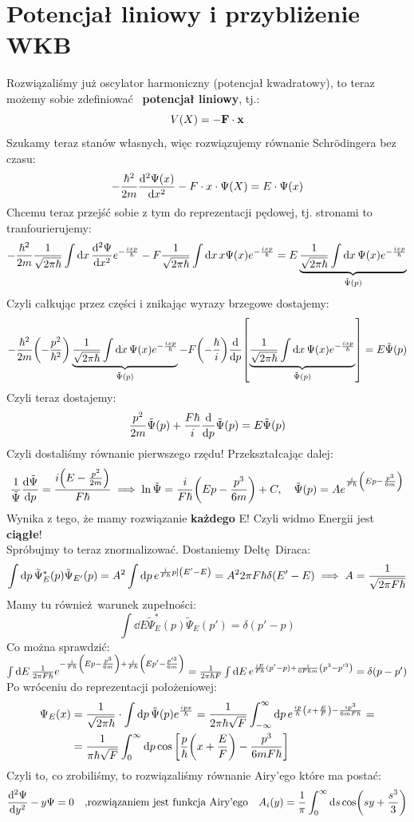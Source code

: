 \documentclass[12pt,a4paper]{report}
\newcommand{\subind}[2]{{\color{blue} #1\index{#2}}}
\newcommand{\tpsi}{\tilde{\Psi}}
\renewcommand{\emph}{\textbf}
\newcommand{\fft}[1]{\frac{1}{\sqrt{2\pi\hbar}} \int \dd{x} #1 e^{-\frac{ixp}{\hbar}}}
\newenvironment{lecture}[1]{\par\medskip
   \noindent\chapter{#1} \rmfamily}{\medskip}
\begin{document}

\begin{lecture}{Potencjał liniowy i przybliżenie WKB}
Rozwiązaliśmy już oscylator harmoniczny (potencjał kwadratowy), to teraz możemy sobie zdefiniować \emph{\subind{potencjał liniowy}{Potencjał!Liniowy}}, tj.:
\[
    V(X) = - \vb{F}\cdot \vb{x}
\]
Szukamy teraz stanów własnych, więc rozwiązujemy równanie Schrödingera bez czasu:
\[
    - \frac{\hbar^2}{2m} \dv[2]{\Psi(x)}{x} - F\cdot x \cdot \Psi(X) = E \cdot \Psi(x)
\]
Chcemu teraz przejść sobie z tym do reprezentacji pędowej, tj. stronami to tranfourierujemy:
\[
    -\frac{\hbar^2}{2m} \fft{\dv[2]{\Psi}{x}} - F \fft{x \Psi(x)} = E \underbrace{\fft{\Psi(x)}}_{\tilde{\Psi}(p)}
\]
Czyli całkując przez części i znikając wyrazy brzegowe dostajemy:
\[
    - \frac{\hbar^2}{2m} \qty(-\frac{p^2}{\hbar^2}) \underbrace{\fft{\Psi(x)}}_{\tilde{\Psi}(p)} - F \qty(- \frac{\hbar}{i}) \dv{p} \qty[\underbrace{\fft{\Psi(x)}}_{\tilde{\Psi}(p)}] = E \tilde{\Psi}(p)
\]
Czyli teraz dostajemy:
\[
    \frac{p^2}{2m} \tpsi(p) + \frac{F\hbar}{i} \dv{p} \tpsi(p) = E \tpsi(p)
\]
{\color{BrickRed}Czyli dostaliśmy równanie pierwszego rzędu!} Przekształcając dalej:
\[
    \frac{1}{\tpsi} \dv{\tpsi}{p} = \frac{i\qty(E - \frac{p^2}{2m})}{F\hbar} \implies \ln \tpsi = \frac{i}{F\hbar} \qty(Ep - \frac{p^3}{6m}) + C\qc \tpsi(p) = A e^{\frac{i}{F\hbar} \qty(Ep-\frac{p^3}{6m})}
\]
Wynika z tego, że {\color{OrangeRed} mamy rozwiązanie \textbf{każdego} E!} Czyli widmo Energii jest {\color{JungleGreen}\textbf{ciągłe}}!\\
Spróbujmy to teraz znormalizować. Dostaniemy Deltę Diraca:
\[
    \int \dd{p} \tpsi_E^\ast(p) \tpsi_{E'}(p) = A^2 \int \dd{p} e^{\frac{i}{F\hbar} p ]\qty(E' - E)} = A^2 2 \pi F \hbar \delta(E'-E)\implies A = \frac{1}{\sqrt{2 \pi F \hbar}}
\]
Mamy tu również warunek zupełności:
\[
    \int \dd{E} \tpsi_E^\ast(p) \tpsi_E(p') = \delta(p'-p)
\]
Co można sprawdzić: $\int \dd{E} \frac{1}{2\pi F\hbar} e^{-\frac{i}{F\hbar} \qty(Ep - \frac{p^3}{6m}) + \frac{i}{F\hbar} \qty(Ep' - \frac{p'^3}{6m})} = \frac{1}{2\pi\hbar F} \int \dd{E} e^{\frac{iE}{F\hbar}(p'-p) + \frac{i}{6 F \hbar m} \qty(p^3-p'^3)} = \delta(p-p')$\\
Po wróceniu do reprezentacji położeniowej:
\begin{align*}
    \Psi_E(x) &= \frac{1}{\sqrt{2\pi\hbar}} \cdot \int \dd{p} \tpsi(p) e^{\frac{ipx}{\hbar}} = \frac{1}{2 \pi \hbar \sqrt{F}} \int_{-\infty}^{\infty} \dd{p} e^{\frac{ip}{\hbar} \qty(x + \frac{E}{F}) - \frac{i p^3}{6mF\hbar}}=\\
    &=\frac{1}{\pi \hbar \sqrt{F}} \int_0^\infty \dd{p} \cos\qty[\frac{p}{\hbar}\qty(x + \frac{E}{F}) - \frac{p^3}{6 m F \hbar}]
\end{align*}
Czyli to, co zrobiliśmy, to rozwiązaliśmy \subind{równanie Airy'ego}{Równanie!Airy} które ma postać:
\[
    \dv[2]{\Psi}{y} - y \Psi = 0\qq{,rozwiązaniem jest funkcja Airy'ego} A_i(y) = \frac{1}{\pi} \int_0^\infty \dd{s} \cos(sy + \frac{s^3}{3})
\]


\end{lecture}
\end{document}

